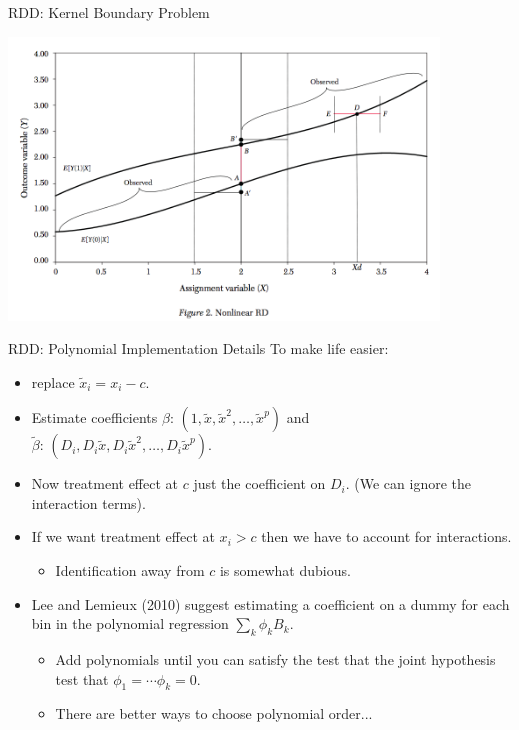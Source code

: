 \documentclass[xcolor=pdftex,dvipsnames,table,mathserif]{beamer}
\begin{document}
\begin{frame}{RDD: Kernel Boundary Problem}
\begin{center}
\includegraphics[width=4.5in]{./resources/ll-fig2}
\end{center}
\end{frame}

\begin{frame}{RDD: Polynomial Implementation Details}
To make life easier:
\begin{itemize}
\item replace $\tilde{x}_i = x_i - c$.
\item Estimate coefficients $\beta$: $(1, \tilde{x}, \tilde{x}^2, \ldots, \tilde{x}^p)$ and\\
 $\tilde{\beta}$: $(D_i, D_i \tilde{x},D_i \tilde{x}^2, \ldots, D_i \tilde{x}^p)$.
 \item Now treatment effect at $c$ just the coefficient on $D_i$. (We can ignore the interaction terms).
 \item If we want treatment effect at $x_i > c$ then we have to account for interactions.
 \begin{itemize}
 \item Identification away from $c$ is somewhat dubious.
\end{itemize}
\item Lee and Lemieux (2010) suggest estimating a coefficient on a dummy for each bin in the polynomial regression $\sum_{k} \phi_k B_k$.
 \begin{itemize}
 \item Add polynomials until you can satisfy the test that the joint hypothesis test that $\phi_1 = \cdots \phi_k= 0$.
\item There are better ways to choose polynomial order...
\end{itemize}
\end{itemize}
\end{frame}
\end{document}

